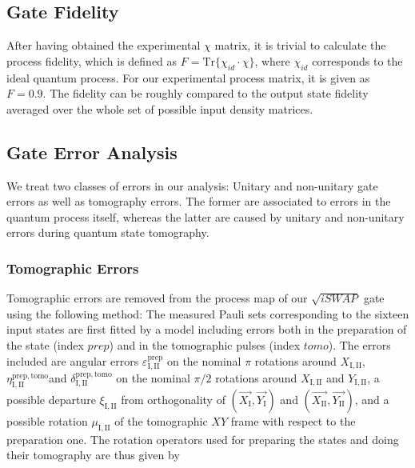 \subsection{Gate Fidelity}

After having obtained the experimental $\chi$ matrix, it is trivial to calculate the process fidelity, which is defined as $F=\mathrm{Tr}\{\chi_{id}\cdot\chi\}$, where $\chi_{id}$ corresponds to the ideal quantum process. For our experimental process matrix, it is given as $F=0.9$. The fidelity can be roughly compared to the output state fidelity averaged over the whole set of possible input density matrices.

\subsection{Gate Error Analysis}

We treat two classes of errors in our analysis: Unitary and non-unitary gate errors as well as tomography errors. The former are associated to errors in the quantum process itself, whereas the latter are caused by unitary and non-unitary errors during quantum state tomography.

\smallskip

\subsubsection{Tomographic Errors} \label{section:tomographic_errors}

Tomographic errors are removed from the process map of our $\sqrt{iSWAP}$
gate using the following method: The measured Pauli sets corresponding
to the sixteen input states are first fitted by a model including
errors both in the preparation of the state (index $prep$) and in
the tomographic pulses (index $tomo$). The errors included are angular
errors $\varepsilon_{\mathrm{I,II}}^{\mathrm{prep}}$ on the nominal
$\pi$ rotations around $X_{\mathrm{I,II}}$, $\eta_{\mathrm{I,II}}^{\mathrm{prep,tomo}}$and
$\delta_{\mathrm{I,II}}^{\mathrm{prep,tomo}}$ on the nominal $\pi/2$
rotations around $X_{\mathrm{I,II}}$ and $Y_{\mathrm{I,II}}$, a
possible departure $\xi_{\mathrm{I,II}}$ from orthogonality of $\left(\overrightarrow{X_{\mathrm{I}}},\overrightarrow{Y_{\mathrm{I}}}\right)$
and $\left(\overrightarrow{X_{\mathrm{II}}},\overrightarrow{Y_{\mathrm{II}}}\right)$,
and a possible rotation $\mu_{\mathrm{I,II}}$ of the tomographic
$XY$ frame with respect to the preparation one. The rotation operators
used for preparing the states and doing their tomography are thus
given by

